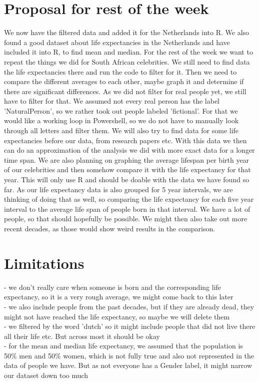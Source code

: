 \documentclass{article}
\begin{document}
\section{Proposal for rest of the week}
We now have the filtered data and added it for the Netherlands into R. We also found a good dataset about life expectancies in the Netherlands and have included it into R, to find mean and median. For the rest of the week we want to repeat the things we did for South African celebrities. We still need to find data the life expectancies there and run the code to filter for it. Then we need to compare the different averages to each other, maybe graph it and determine if there are significant differences. 
As we did not filter for real people yet, we still have to filter for that. We assumed not every real person has the label 'NaturalPerson', so we rather took out people labeled 'fictional'. For that we would like a working loop in Powershell, so we do not have to manually look through all letters and filter them. 
We will also try to find data for some life expectancies before our data, from research papers etc. With this data we then can do an approximation of the analysis we did with more exact data for a longer time span.
We are also planning on graphing the average lifespan per birth year of our celebrities and then somehow compare it with the life expectancy for that year. This will only use R and should be doable with the data we have found so far. As our life expectancy data is also grouped for 5 year intervals, we are thinking of doing that as well, so comparing the life expectancy for each five year interval to the average life span of people born in that interval. We have a lot of people, so that should hopefully be possible. We might then also take out more recent decades, as those would show weird results in the comparison. 

\section{Limitations}
- we don't really care when someone is born and the corresponding life expectancy, so it is a very rough average, we might come back to this later\\
- we also include people from the past decades, but if they are already dead, they might not have reached the life expectancy, so maybe we will delete them\\
- we filtered by the word 'dutch' so it might include people that did not live there all their life etc. But across most it should be okay\\
- for the mean and median life expectancy, we assumed that the population is 50\% men and 50\% women, which is not fully true and also not represented in the data of people we have. But as not everyone has a Gender label, it might narrow our dataset down too much\\
\end{document}
